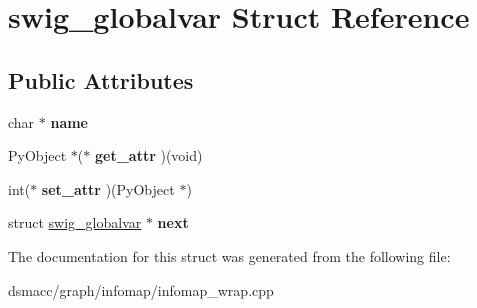 \hypertarget{structswig__globalvar}{}\section{swig\+\_\+globalvar Struct Reference}
\label{structswig__globalvar}
\subsection*{Public Attributes}
\begin{DoxyCompactItemize}
\item 
\mbox{\label{structswig__globalvar_a32fcb5efb741f97e5c53e1a253cafdd9}} 
char $\ast$ {\bfseries name}
\item 
\mbox{\label{structswig__globalvar_ab617d0ca02f7660a9e5fd31dceaf6475}} 
Py\+Object $\ast$($\ast$ {\bfseries get\+\_\+attr} )(void)
\item 
\mbox{\label{structswig__globalvar_acff619325c0e354df88508d64c1608e6}} 
int($\ast$ {\bfseries set\+\_\+attr} )(Py\+Object $\ast$)
\item 
\mbox{\label{structswig__globalvar_a6b7f8fdec3a5c39a52b33c916d7ba028}} 
struct \mbox{\hyperlink{structswig__globalvar}{swig\+\_\+globalvar}} $\ast$ {\bfseries next}
\end{DoxyCompactItemize}


The documentation for this struct was generated from the following file\+:\begin{DoxyCompactItemize}
\item 
dsmacc/graph/infomap/infomap\+\_\+wrap.\+cpp\end{DoxyCompactItemize}
